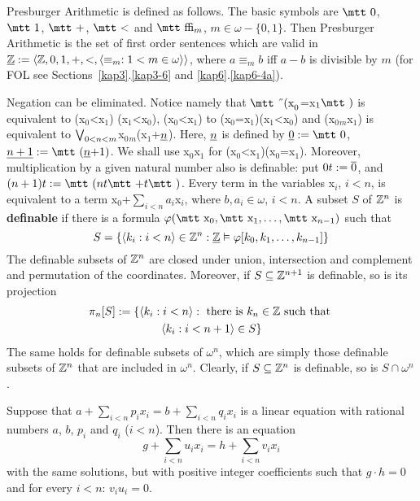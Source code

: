 Presburger Arithmetic is defined as follows. The basic symbols are 
$\mbox{\mtt 0}$, $\mbox{\mtt 1}$, $\mbox{\mtt +}$, $\mbox{\mtt <}$ 
and $\mbox{\mtt \symbol{30}}_m$, $m \in \omega - \{0,1\}$. 
Then Presburger Arithmetic is the set of first order sentences which 
are valid in $\uli{\BZ} := \auf \BZ, 0, 1, +, <, %
\auf \equiv_m : 1 < m \in \omega\zu\zu$, where $a \equiv_m b$ iff 
$a - b$ is divisible by $m$ (for FOL see Sections~\ref{kap3}.\ref{kap3-6} 
and \ref{kap6}.\ref{kap6-4a}). 

Negation can be eliminated. Notice namely that $\mbox{\mtt \symbol{5}%
(x}_0$=x$_1\mbox{\mtt )}$ is equivalent to {\mtt (x$_0$<x$_1$)%
(x$_1$<x$_0$)}, {\mtt {}(x$_0$<x$_1$)} to 
{\mtt (x$_0$=x$_1$)(x$_1$<x$_0$)}
and {\mtt {}(x$_0$$_m$x$_1$)} is equivalent to 
{\mtt $\bigvee_{0 < n < m}$x$_0$$_m$(x$_1$+$\underline{n}$)}. 
Here, $\underline{n}$ is defined by $\uli{0} := \mbox{\mtt 0}$, 
$\uli{n+1} := \mbox{\mtt ($\uli{n}$+1)}$. We shall 
use {\mtt x$_0$x$_1$} for 
{\mtt (x$_0$<x$_1$)(x$_0$=x$_1$)}. Moreover, multiplication 
by a given natural number also is definable: put $0t := \overline{0}$, and 
$(n+1)t := \mbox{\mtt (}nt \mbox{\mtt +} t\mbox{\mtt )}$. Every term 
in the variables {\mtt x$_i$}, $i < n$, is equivalent to 
a term {\mtt x$_0$+$\sum_{i < n}a_i$x$_i$}, where $b, a_i \in \omega$, 
$i < n$. A subset $S$ of $\mathbb{Z}^n$ is \textbf{definable} 
if there is a formula $\varphi(\mbox{\mtt x}_0, \mbox{\mtt x}_1, \dotsc, %
\mbox{\mtt x}_{n-1})$ such that 
\begin{equation}
S = \{\langle k_i : i < n\rangle \in \mathbb{Z}^n : \underline{\mathbb{Z}} \vDash 
	\varphi[k_0, k_1, \dotsc, k_{n-1}]\}
\end{equation}
The definable subsets of $\mathbb{Z}^n$ are closed under union, intersection 
and complement and permutation of the coordinates. Moreover, if 
$S \subseteq \mathbb{Z}^{n+1}$ is definable, so is its projection 
\begin{multline}
\pi_n[S] := \{\langle k_i : i < n\rangle : \text{ there is }
k_n \in \mathbb{Z} \text{ such that } \\
		\langle k_i : i < n+1\rangle \in S\}
\end{multline}
The same holds for definable subsets of $\omega^n$, which are simply 
those definable subsets of $\mathbb{Z}^n$ that are included in $\omega^n$.
Clearly, if $S \subseteq \mathbb{Z}^n$ is definable, so is $S \cap \omega^n$.
\begin{lem}
Suppose that $a + \sum_{i < n} p_i x_i = b + \sum_{i < n} q_i x_i$ 
is a linear equation with rational numbers $a$, $b$, $p_i$ and 
$q_i$ ($i < n$). Then there is an equation 
\begin{equation}
g + \sum_{i < n} u_i x_i = h + \sum_{i < n} v_i x_i
\end{equation}
with the same solutions, but with positive integer coefficients such 
that $g \cdot h = 0$ and for every $i < n$: $v_i u_i = 0$.
\end{lem}
